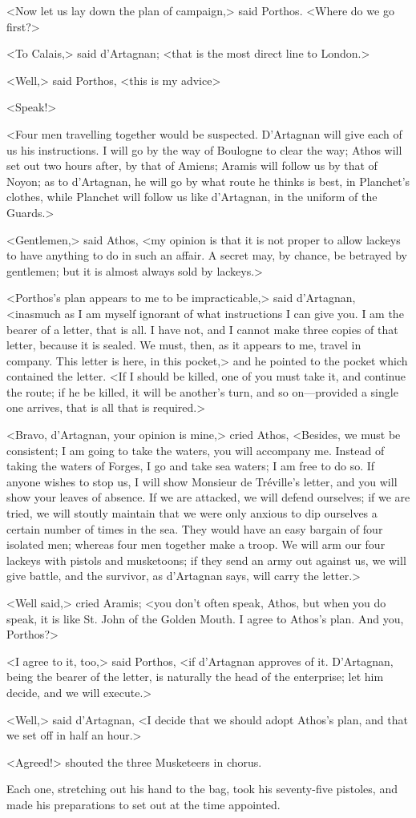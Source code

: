 <Now let us lay down the plan of campaign,> said Porthos. <Where do we go first?> 

<To Calais,> said d'Artagnan; <that is the most direct line to London.> 

<Well,> said Porthos, <this is my advice\longdash> 

<Speak!> 

<Four men travelling together would be suspected. D'Artagnan will give each of us his instructions. I will go by the way of Boulogne to clear the way; Athos will set out two hours after, by that of Amiens; Aramis will follow us by that of Noyon; as to d'Artagnan, he will go by what route he thinks is best, in Planchet's clothes, while Planchet will follow us like d'Artagnan, in the uniform of the Guards.> 

<Gentlemen,> said Athos, <my opinion is that it is not proper to allow lackeys to have anything to do in such an affair. A secret may, by chance, be betrayed by gentlemen; but it is almost always sold by lackeys.> 

<Porthos's plan appears to me to be impracticable,> said d'Artagnan, <inasmuch as I am myself ignorant of what instructions I can give you. I am the bearer of a letter, that is all. I have not, and I cannot make three copies of that letter, because it is sealed. We must, then, as it appears to me, travel in company. This letter is here, in this pocket,> and he pointed to the pocket which contained the letter. <If I should be killed, one of you must take it, and continue the route; if he be killed, it will be another's turn, and so on---provided a single one arrives, that is all that is required.> 

<Bravo, d'Artagnan, your opinion is mine,> cried Athos, <Besides, we must be consistent; I am going to take the waters, you will accompany me. Instead of taking the waters of Forges, I go and take sea waters; I am free to do so. If anyone wishes to stop us, I will show Monsieur de Tréville's letter, and you will show your leaves of absence. If we are attacked, we will defend ourselves; if we are tried, we will stoutly maintain that we were only anxious to dip ourselves a certain number of times in the sea. They would have an easy bargain of four isolated men; whereas four men together make a troop. We will arm our four lackeys with pistols and musketoons; if they send an army out against us, we will give battle, and the survivor, as d'Artagnan says, will carry the letter.> 

<Well said,> cried Aramis; <you don't often speak, Athos, but when you do speak, it is like St. John of the Golden Mouth. I agree to Athos's plan. And you, Porthos?> 

<I agree to it, too,> said Porthos, <if d'Artagnan approves of it. D'Artagnan, being the bearer of the letter, is naturally the head of the enterprise; let him decide, and we will execute.> 

<Well,> said d'Artagnan, <I decide that we should adopt Athos's plan, and that we set off in half an hour.> 

<Agreed!> shouted the three Musketeers in chorus. 

Each one, stretching out his hand to the bag, took his seventy-five pistoles, and made his preparations to set out at the time appointed. 